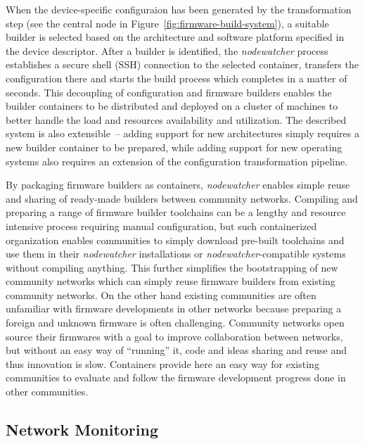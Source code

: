 \documentclass[5p,sort&compress]{elsarticle}
\newcommand{\nodewatcher}{\textit{nodewatcher}}
\begin{document}
When the device-specific configuraion has been generated by the transformation step (see the central node in Figure~\ref{fig:firmware-build-system}), a suitable builder is selected based on the architecture and software platform specified in the device descriptor.
After a builder is identified, the \nodewatcher{} process establishes a secure shell (SSH) connection to the selected container, transfers the configuration there and starts the build process which completes in a matter of seconds.
This decoupling of configuration and firmware builders enables the builder containers to be distributed and deployed on a cluster of machines to better handle the load and resources availability and utilization.
The described system is also extensible~-- adding support for new architectures simply requires a new builder container to be prepared, while adding support for new operating systems also requires an extension of the configuration transformation pipeline.

By packaging firmware builders as containers, \nodewatcher{} enables simple reuse and sharing of ready-made builders between community networks.
Compiling and preparing a range of firmware builder toolchains can be a lengthy and resource intensive process requiring manual configuration, but such containerized organization enables communities to simply download pre-built toolchains and use them in their \nodewatcher{} installations or \nodewatcher{}-compatible systems without compiling anything.
This further simplifies the bootstrapping of new community networks which can simply reuse firmware builders from existing community networks.
On the other hand existing communities are often unfamiliar with firmware developments in other networks because preparing a foreign and unknown firmware is often challenging.
Community networks open source their firmwares with a goal to improve collaboration between networks, but without an easy way of ``running'' it, code and ideas sharing and reuse and thus innovation is slow.
Containers provide here an easy way for existing communities to evaluate and follow the firmware development progress done in other communities.

\subsection{Network Monitoring}
\label{sec:network-monitoring}
\end{document}
